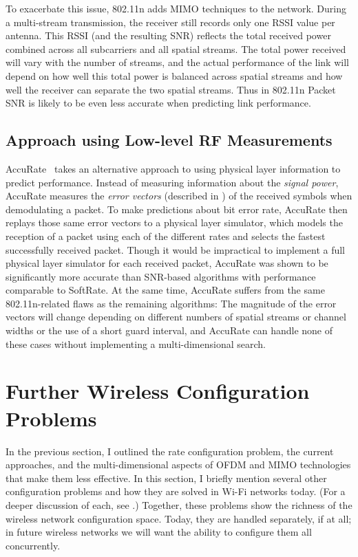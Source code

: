 To exacerbate this issue, 802.11n adds MIMO techniques to the network. During a multi-stream transmission, the receiver still records only one RSSI value per antenna. This RSSI (and the resulting SNR) reflects the total received power combined across all subcarriers and all spatial streams. The total power received will vary with the number of streams, and the actual performance of the link will depend on how well this total power is balanced across spatial streams and how well the receiver can separate the two spatial streams. Thus in 802.11n Packet SNR is likely to be even less accurate when predicting link performance.

\subsection{Approach using Low-level RF Measurements}
\label{sec:accurate}
AccuRate~\cite{Sen_AccuRate} takes an alternative approach to using physical layer information to predict performance. Instead of measuring information about the \emph{signal power}, AccuRate measures the \emph{error vectors} (described in ) of the received symbols when demodulating a packet. To make predictions about bit error rate, AccuRate then replays those same error vectors to a physical layer simulator, which models the reception of a packet using each of the different rates and selects the fastest successfully received packet. Though it would be impractical to implement a full physical layer simulator for each received packet, AccuRate was shown to be significantly more accurate than SNR-based algorithms with performance comparable to SoftRate. At the same time, AccuRate suffers from the same 802.11n-related flaws as the remaining algorithms: The magnitude of the error vectors will change depending on different numbers of spatial streams or channel widths or the use of a short guard interval, and AccuRate can handle none of these cases without implementing a multi-dimensional search.

\section{Further Wireless Configuration Problems}
\label{sec:problems_11n}
In the previous section, I outlined the rate configuration problem, the current approaches, and the multi-dimensional aspects of OFDM and MIMO technologies that make them less effective. In this section, I briefly mention several other configuration problems and how they are solved in Wi-Fi networks today. (For a deeper discussion of each, see .) Together, these problems show the richness of the wireless network configuration space. Today, they are handled separately, if at all; in future wireless networks we will want the ability to configure them all concurrently.

